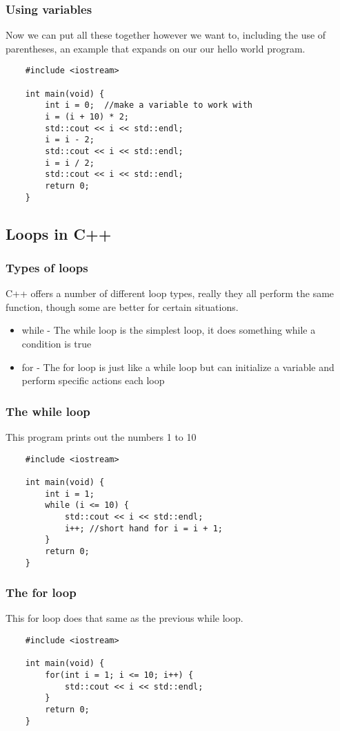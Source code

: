 \documentclass{beamer}
\begin{document}
\begin{frame}[fragile]
	\frametitle{Using variables}
	Now we can put all these together however we want to, including
	the use of parentheses, an example that expands on our our hello
	world program.
	\begin{lstlisting}
	#include <iostream>

	int main(void) {
	    int i = 0;  //make a variable to work with
	    i = (i + 10) * 2;
	    std::cout << i << std::endl;
	    i = i - 2;
	    std::cout << i << std::endl;
	    i = i / 2;
	    std::cout << i << std::endl;
	    return 0;
	}
	\end{lstlisting}
\end{frame}

\subsection{Loops in C++}

\begin{frame}
	\frametitle{Types of loops}
	C++ offers a number of different loop types, really they all perform
	the same function, though some are better for certain situations.
	\begin{itemize}
		\item while - The while loop is the simplest loop, it does something while a condition is true
		\item for - The for loop is just like a while loop but can initialize a variable and perform specific actions each loop
	\end{itemize}
\end{frame}

\begin{frame}[fragile]
	\frametitle{The while loop}
	This program prints out the numbers 1 to 10
	\begin{lstlisting}
	#include <iostream>

	int main(void) {
	    int i = 1;
	    while (i <= 10) {
	        std::cout << i << std::endl;
	        i++; //short hand for i = i + 1;
	    }
	    return 0;
	}
	\end{lstlisting}
\end{frame}

\begin{frame}[fragile]
	\frametitle{The for loop}
	This for loop does that same as the previous while loop.

	\begin{lstlisting}
	#include <iostream>

	int main(void) {
	    for(int i = 1; i <= 10; i++) {
	        std::cout << i << std::endl;
	    }
	    return 0;
	}
	\end{lstlisting}
\end{frame}
\end{document}
